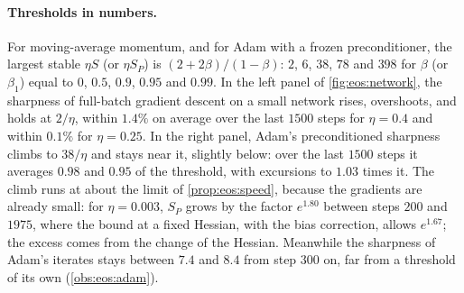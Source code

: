 \begin{refsection}
\paragraph{Thresholds in numbers.} For moving-average momentum, and for Adam with a frozen preconditioner, the largest stable $\eta S$ (or $\eta S_P$) is $(2+2\beta)/(1-\beta)$: $2$, $6$, $38$, $78$ and $398$ for $\beta$ (or $\beta_1$) equal to $0$, $0.5$, $0.9$, $0.95$ and $0.99$. In the left panel of \cref{fig:eos:network}, the sharpness of full-batch gradient descent on a small network rises, overshoots, and holds at $2/\eta$, within $1.4\%$ on average over the last $1500$ steps for $\eta=0.4$ and within $0.1\%$ for $\eta=0.25$. In the right panel, Adam's preconditioned sharpness climbs to $38/\eta$ and stays near it, slightly below: over the last $1500$ steps it averages $0.98$ and $0.95$ of the threshold, with excursions to $1.03$ times it. The climb runs at about the limit of \cref{prop:eos:speed}, because the gradients are already small: for $\eta=0.003$, $S_P$ grows by the factor $e^{1.80}$ between steps $200$ and $1975$, where the bound at a fixed Hessian, with the bias correction, allows $e^{1.67}$; the excess comes from the change of the Hessian. Meanwhile the sharpness of Adam's iterates stays between $7.4$ and $8.4$ from step $300$ on, far from a threshold of its own (\cref{obs:eos:adam}).


\end{refsection}
